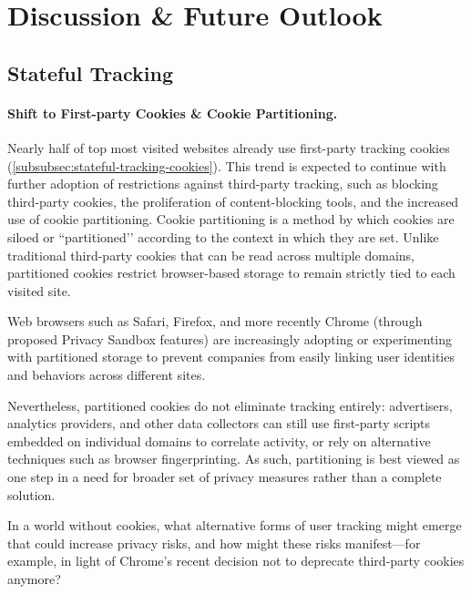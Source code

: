 \section{Discussion \& Future Outlook}
\label{sec:future-outlook}

\subsection{Stateful Tracking}
\paragraph{Shift to First-party Cookies \& Cookie Partitioning.}
Nearly half of top most visited websites already use first-party tracking cookies (\autoref{subsubsec:stateful-tracking-cookies}).
%
This trend is expected to continue with further adoption of restrictions against third-party tracking, such as blocking third-party cookies, the proliferation of content-blocking tools, and the increased use of cookie partitioning.
%
Cookie partitioning is a method by which cookies are siloed or ``partitioned’’ according to the context in which they are set.
%
Unlike traditional third-party cookies that can be read across multiple domains, partitioned cookies restrict browser-based storage to remain strictly tied to each visited site.

Web browsers such as Safari, Firefox, and more recently Chrome (through proposed Privacy Sandbox features) are increasingly adopting or experimenting with partitioned storage to prevent companies from easily linking user identities and behaviors across different sites.

Nevertheless, partitioned cookies do not eliminate tracking entirely: advertisers, analytics providers, and other data collectors can still use first-party scripts embedded on individual domains to correlate activity, or rely on alternative techniques such as browser fingerprinting.
%
As such, partitioning is best viewed as one step in a need for broader set of privacy measures rather than a complete solution.

\begin{opbox}
In a world without cookies, what alternative forms of user tracking might emerge that could increase privacy risks, and how might these risks manifest---for example, in light of Chrome’s recent decision not to deprecate third-party cookies anymore?
\end{opbox}


